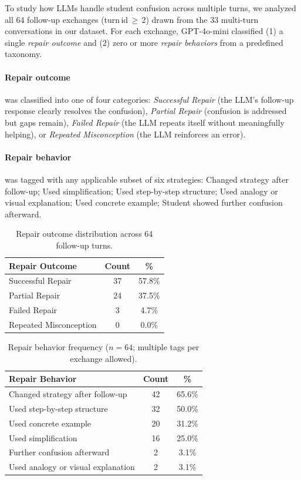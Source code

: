 To study how LLMs handle student confusion across multiple turns, we analyzed all 64 follow-up exchanges (turn\,id\,$\geq$\,2) drawn from the 33 multi-turn conversations in our dataset. For each exchange, GPT-4o-mini classified (1) a single \emph{repair outcome} and (2) zero or more \emph{repair behaviors} from a predefined taxonomy.

\paragraph{Repair outcome} was classified into one of four categories: \emph{Successful Repair} (the LLM's follow-up response clearly resolves the confusion), \emph{Partial Repair} (confusion is addressed but gaps remain), \emph{Failed Repair} (the LLM repeats itself without meaningfully helping), or \emph{Repeated Misconception} (the LLM reinforces an error).

\paragraph{Repair behavior} was tagged with any applicable subset of six strategies: Changed strategy after follow-up; Used simplification; Used step-by-step structure; Used analogy or visual explanation; Used concrete example; Student showed further confusion afterward.

\begin{table}[htbp]
\centering
\small
\begin{tabular}{lcc}
\toprule
Repair Outcome & Count & \% \\
\midrule
Successful Repair       & 37 & 57.8\% \\
Partial Repair          & 24 & 37.5\% \\
Failed Repair           &  3 &  4.7\% \\
Repeated Misconception  &  0 &  0.0\% \\
\bottomrule
\end{tabular}
\caption{Repair outcome distribution across 64 follow-up turns.}
\label{tab:repair-outcomes}
\end{table}

\begin{table}[htbp]
\centering
\small
\begin{tabular}{lcc}
\toprule
Repair Behavior & Count & \% \\
\midrule
Changed strategy after follow-up       & 42 & 65.6\% \\
Used step-by-step structure            & 32 & 50.0\% \\
Used concrete example                  & 20 & 31.2\% \\
Used simplification                    & 16 & 25.0\% \\
Further confusion afterward            &  2 &  3.1\% \\
Used analogy or visual explanation     &  2 &  3.1\% \\
\bottomrule
\end{tabular}
\caption{Repair behavior frequency ($n=64$; multiple tags per exchange allowed).}
\label{tab:repair-behaviors}
\end{table}

